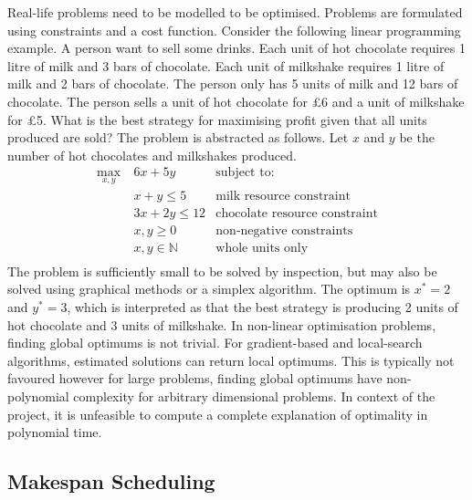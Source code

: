 Real-life problems need to be modelled to be optimised. Problems are formulated using constraints and a cost function. Consider the following linear programming example. A person want to sell some drinks. Each unit of hot chocolate requires 1 litre of milk and 3 bars of chocolate. Each unit of milkshake requires 1 litre of milk and 2 bars of chocolate. The person only has 5 units of milk and 12 bars of chocolate. The person sells a unit of hot chocolate for £6 and a unit of milkshake for £5. What is the best strategy for maximising profit given that all units produced are sold? The problem is abstracted as follows. Let $x$ and $y$ be the number of hot chocolates and milkshakes produced.
\begin{align*}
	\max_{x,y}\ &6x+5y&\text{subject to:}\\
	&x+y\leq 5&\text{milk resource constraint}\\
	&3x+2y\leq 12&\text{chocolate resource constraint}\\
	&x,y\geq 0&\text{non-negative constraints}\\
	&x,y\in\mathbb{N}&\text{whole units only}\\
\end{align*}
The problem is sufficiently small to be solved by inspection, but may also be solved using graphical methods or a simplex algorithm. The optimum is $x^*=2$ and $y^*=3$, which is interpreted as that the best strategy is producing 2 units of hot chocolate and 3 units of milkshake.
\linespace
In non-linear optimisation problems, finding global optimums is not trivial. For gradient-based and local-search algorithms, estimated solutions can return local optimums. This is typically not favoured however for large problems, finding global optimums have non-polynomial complexity for arbitrary dimensional problems. In context of the project, it is unfeasible to compute a complete explanation of optimality in polynomial time.

\subsection{Makespan Scheduling}
\label{makespan}

